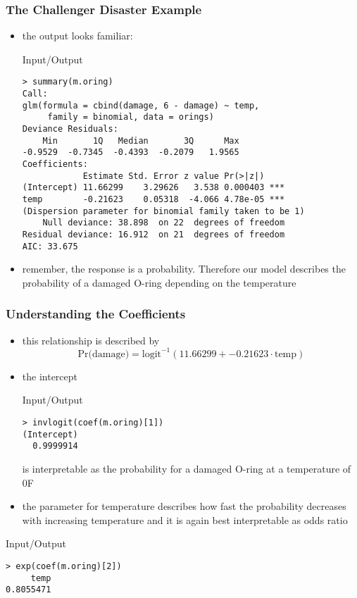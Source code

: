 \begin{frame}[fragile]\frametitle{The Challenger Disaster Example}
\begin{itemize}
\item the output looks familiar:
  \begin{exampleblock}{Input/Output}\scriptsize
\begin{verbatim}
> summary(m.oring)
Call:
glm(formula = cbind(damage, 6 - damage) ~ temp, 
     family = binomial, data = orings)
Deviance Residuals: 
    Min       1Q   Median       3Q      Max  
-0.9529  -0.7345  -0.4393  -0.2079   1.9565  
Coefficients:
            Estimate Std. Error z value Pr(>|z|)    
(Intercept) 11.66299    3.29626   3.538 0.000403 ***
temp        -0.21623    0.05318  -4.066 4.78e-05 ***
(Dispersion parameter for binomial family taken to be 1)
    Null deviance: 38.898  on 22  degrees of freedom
Residual deviance: 16.912  on 21  degrees of freedom
AIC: 33.675
\end{verbatim}
  \end{exampleblock}
\item remember, the response is a probability. Therefore our model describes the probability of a damaged O-ring depending on the temperature
\end{itemize}
\end{frame}


\begin{frame}[fragile]\frametitle{Understanding the Coefficients}
\begin{itemize}
\item this relationship is described by $$\mbox{Pr(damage)}=\mbox{logit}^{-1}(11.66299 + -0.21623 \cdot \mbox{temp}) $$
\item the intercept
  \begin{exampleblock}{Input/Output}
\begin{verbatim}
> invlogit(coef(m.oring)[1])
(Intercept) 
  0.9999914 
\end{verbatim}
  \end{exampleblock}

is interpretable as the probability for a damaged O-ring at a temperature of 0\degree F
\item the parameter for temperature describes how fast the probability decreases with increasing temperature and it is again best interpretable as odds ratio 
\end{itemize}
\begin{exampleblock}{Input/Output}\footnotesize
\begin{verbatim}
> exp(coef(m.oring)[2])
     temp 
0.8055471 
\end{verbatim}
\end{exampleblock}

\end{frame}

